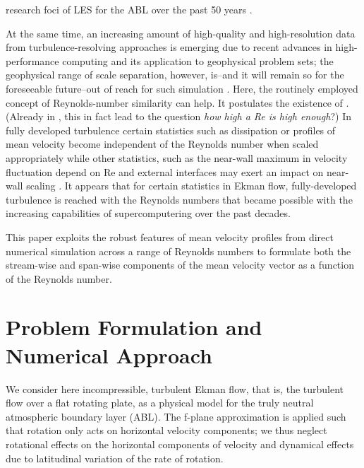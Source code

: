 \documentclass[a4paper,11pt]{amsart}
\newcommand{\RE}{\mathrm{Re}}
\begin{document}
research foci of LES for the ABL over the past 50 years \citep{stoll:BM2020}. 
%
\par
% 
At the same time, an increasing amount of high-quality and high-resolution data from turbulence-resolving approaches
is emerging due to recent advances in high-performance computing and its application to geophysical problem sets;
the geophysical range of scale separation, however, is--and it will remain so for the foreseeable future--out of reach
for such simulation \citep{dimotakis:ARF2005}.
%
Here, the routinely employed concept of Reynolds-number similarity can help. It postulates the existence
of 
\citep{barenblatt:PF1995}.
%
(Already in \citeyear{moin:ARF1998}, this in fact lead \citeauthor{moin:ARF1998} to the question \emph{how high a Re is high enough}?) 
%
In fully developed turbulence certain statistics such as dissipation \citep{dimotakis:ARF2005} or profiles of
mean velocity \citep{barenblatt:JFM1993} become independent of the Reynolds number when scaled appropriately while
other statistics, such as the near-wall maximum in velocity fluctuation depend on $\RE$ \citep{baars:JFM2020a} and external
interfaces may exert an impact on near-wall scaling \citep{dasilva:ARF2014}. 
%
It appears that for certain statistics in Ekman flow, fully-developed turbulence is reached with the
Reynolds numbers that became possible with the increasing capabilities of supercomputering over
the past decades.
%
\par
% 
This paper exploits the robust features of mean velocity profiles from direct numerical
simulation across a range of Reynolds numbers to formulate both the stream-wise and span-wise components
of the mean velocity vector as a function of the Reynolds number.
%
\section{Problem Formulation and Numerical Approach}
%
We consider here incompressible, turbulent Ekman flow, that is, the turbulent flow over a flat rotating plate, as
a physical model for the truly neutral atmospheric boundary layer (ABL).
%
The f-plane approximation is applied such that rotation only acts on horizontal velocity components;
we thus neglect rotational effects on the horizontal components of velocity and dynamical effects
due to latitudinal variation of the rate of rotation.
%
\end{document}

